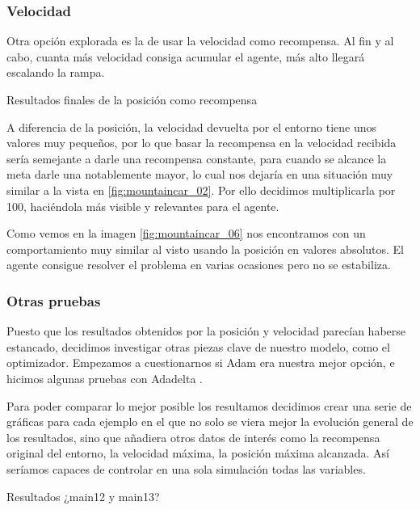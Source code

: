 

\subsubsection*{Velocidad}

Otra opción explorada es la de usar la velocidad como recompensa. Al fin y al cabo, cuanta más velocidad consiga acumular el agente, más alto llegará escalando la rampa.

%
       {Resultados finales de la posición como recompensa}

A diferencia de la posición, la velocidad devuelta por el entorno tiene unos valores muy pequeños, por lo que basar la recompensa en la velocidad recibida sería semejante a darle una recompensa constante, para cuando se alcance la meta darle una notablemente mayor, lo cual nos dejaría en una situación muy similar a la vista en \ref{fig:mountaincar_02}. Por ello decidimos multiplicarla por 100, haciéndola más visible y relevantes para el agente. 

Como vemos en la imagen \ref{fig:mountaincar_06} nos encontramos con un comportamiento muy similar al visto usando la posición en valores absolutos. El agente consigue resolver el problema en varias ocasiones pero no se estabiliza.



\subsubsection*{Otras pruebas}

Puesto que los resultados obtenidos por la posición y velocidad parecían haberse estancado, decidimos investigar otras piezas clave de nuestro modelo, como el optimizador. Empezamos a cuestionarnos si Adam \citep{kingma2014adam} era nuestra mejor opción, e hicimos algunas pruebas con Adadelta \citep{NIPS2017_7003}.

Para poder comparar lo mejor posible los resultamos decidimos crear una serie de gráficas para cada ejemplo en el que no solo se viera mejor la evolución general de los resultados, sino que añadiera otros datos de interés como la recompensa original del entorno, la velocidad máxima, la posición máxima alcanzada. Así seríamos capaces de controlar en una sola simulación todas las variables.

%
       {Resultados ¿main12 y main13?}

